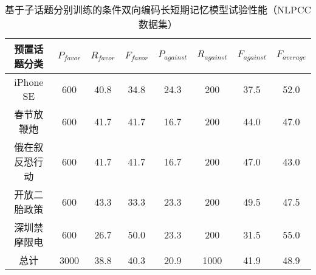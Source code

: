 \begin{table}[htbp]
	\caption[table123]{基于子话题分别训练的条件双向编码长短期记忆模型试验性能（NLPCC数据集）}
	\label{chinesedata}
	\vspace{0.5em}\centering\wuhao
	\begin{tabular}{cccccccc}
		\toprule[1.5pt]
		预置话题分类& $P_{favor}$&$R_{favor}$&$F_{favor}$&$P_{against}$&$R_{against}$&$F_{against}$&$F_{average}$ \\
		\midrule[1pt]
		iPhone SE&600&40.8&34.8&24.3&200&37.5&52.0\\
		春节放鞭炮&600&41.7&41.7&16.7&200&44.0&47.0\\
		俄在叙反恐行动&600&41.7&41.7&16.7&200&47.0&43.0\\
		开放二胎政策&600&43.3&33.3&23.3&200&49.5&47.5\\
		深圳禁摩限电&600&26.7&50.0&23.3&200&31.5&55.0\\
		总计&3000&38.8&40.3&20.9&1000&41.9&48.9\\
		\bottomrule[1.5pt]
	\end{tabular}
\end{table}

